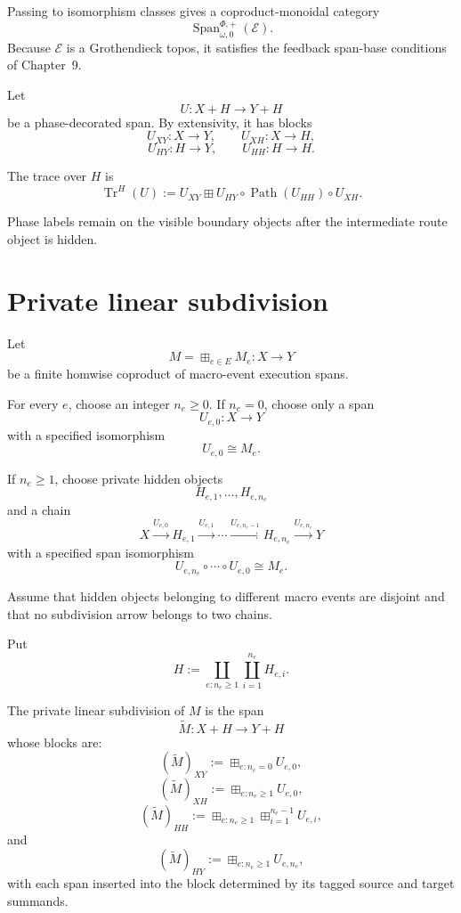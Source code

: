 Passing to isomorphism classes gives a coproduct-monoidal category
\[
  \operatorname{Span}^{\Phi,+}_{\omega,0}(\mathcal E).
\]
Because \(\mathcal E\) is a Grothendieck topos, it satisfies the feedback span-base conditions of
Chapter~9.

Let
\[
  U:X+H\longrightarrow Y+H
\]
be a phase-decorated span. By extensivity, it has blocks
\[
  U_{XY}:X\to Y,
  \qquad
  U_{XH}:X\to H,
\]
\[
  U_{HY}:H\to Y,
  \qquad
  U_{HH}:H\to H.
\]

\begin{definition}
\label{def:phase-indexed-execution-trace}
The trace over \(H\) is
\[
  \operatorname{Tr}^{H}(U)
  :=
  U_{XY}
  \boxplus
  U_{HY}
  \circ
  \operatorname{Path}(U_{HH})
  \circ
  U_{XH}.
\]
\end{definition}

Phase labels remain on the visible boundary objects after the intermediate route object is hidden.

\section{Private linear subdivision}
\label{sec:private-linear-subdivision}

Let
\[
  M=\boxplus_{e\in E}M_e:X\longrightarrow Y
\]
be a finite homwise coproduct of macro-event execution spans.

For every \(e\), choose an integer \(n_e\geq0\). If \(n_e=0\), choose only a span
\[
  U_{e,0}:X\to Y
\]
with a specified isomorphism
\[
  U_{e,0}\cong M_e.
\]

If \(n_e\geq1\), choose private hidden objects
\[
  H_{e,1},\ldots,H_{e,n_e}
\]
and a chain
\[
  X
  \xrightarrow{U_{e,0}}
  H_{e,1}
  \xrightarrow{U_{e,1}}
  \cdots
  \xrightarrow{U_{e,n_e-1}}
  H_{e,n_e}
  \xrightarrow{U_{e,n_e}}
  Y
\]
with a specified span isomorphism
\[
  U_{e,n_e}\circ\cdots\circ U_{e,0}
  \cong
  M_e.
\]

Assume that hidden objects belonging to different macro events are disjoint and that no subdivision
arrow belongs to two chains.

\begin{definition}
\label{def:private-linear-subdivision}
Put
\[
  H
  :=
  \coprod_{e:n_e\geq1}
  \coprod_{i=1}^{n_e}
  H_{e,i}.
\]

The private linear subdivision of \(M\) is the span
\[
  \widetilde M:
  X+H
  \longrightarrow
  Y+H
\]
whose blocks are:
\[
  (\widetilde M)_{XY}
  :=
  \boxplus_{e:n_e=0}U_{e,0},
\]
\[
  (\widetilde M)_{XH}
  :=
  \boxplus_{e:n_e\geq1}U_{e,0},
\]
\[
  (\widetilde M)_{HH}
  :=
  \boxplus_{e:n_e\geq1}
  \boxplus_{i=1}^{n_e-1}
  U_{e,i},
\]
and
\[
  (\widetilde M)_{HY}
  :=
  \boxplus_{e:n_e\geq1}U_{e,n_e},
\]
with each span inserted into the block determined by its tagged source and target summands.
\end{definition}

